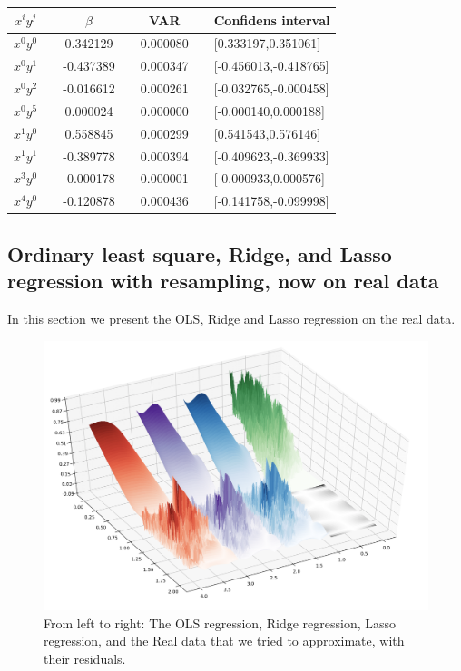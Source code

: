  \begin{center}
\label{tab:lasso-var-conf}
\begin{tabularx}{\textwidth}{c X c X c X l}
    \hline
    \hline
        $x^iy^j$ && $\beta$ && VAR && Confidens interval\\
    \hline
        $x^0y^0$ && 0.342129   && 0.000080   && [0.333197,0.351061] \\
        $x^0y^1$ && -0.437389  && 0.000347   && [-0.456013,-0.418765] \\
        $x^0y^2$ && -0.016612  && 0.000261   && [-0.032765,-0.000458] \\
        $x^0y^5$ && 0.000024   && 0.000000   && [-0.000140,0.000188] \\
        $x^1y^0$ && 0.558845   && 0.000299   && [0.541543,0.576146] \\
        $x^1y^1$ && -0.389778  && 0.000394   && [-0.409623,-0.369933] \\
        $x^3y^0$ && -0.000178  && 0.000001   && [-0.000933,0.000576] \\
        $x^4y^0$ && -0.120878  && 0.000436   && [-0.141758,-0.099998] \\
    \hline
\end{tabularx}
\end{center}


 
\subsection{Ordinary least square, Ridge, and Lasso regression with resampling, now on real data}
In this section we present the OLS, Ridge and Lasso regression on the real data.
\begin{figure}[H]
		\centering
		\includegraphics[width=1.1\linewidth]{result/bilder/all_real.png}
		\caption{From left to right: The \color{red}OLS \color{black} regression, \color{purple}{} Ridge \color{black} regression, \color{blue} Lasso \color{black} regression, and the \color{green}Real data \color{black} that we tried to approximate, with their residuals.}
		\label{fig:RealData}
\end{figure}



